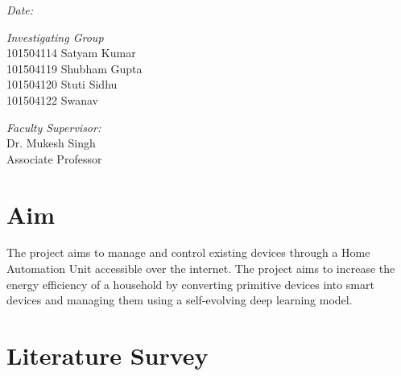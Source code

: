 \documentclass[12pt,a4paper,titlepage,twoside]{article}
\begin{document}
    	\begin{minipage}{0.5\textwidth}
    		\begin{flushleft}
    			\textit{Date:}
    		\end{flushleft}
    		\begin{flushright}
    			
    			\textit{Investigating Group}\\[0.25cm]
    			101504114 Satyam Kumar\\
    			101504119 Shubham Gupta\\
    			101504120 Stuti Sidhu\\
    			101504122 Swanav\\
    		\end{flushright}
    		\begin{flushleft}
    			\textit{Faculty Supervisor:}\\[0.25cm]
    			Dr. Mukesh Singh\\
    			Associate Professor\\
    		\end{flushleft}
    	\end{minipage}
        \section{Aim}
        	The project aims to manage and control existing devices through a Home Automation Unit accessible over the internet.
            The project aims to increase the energy efficiency of a household by converting primitive devices into smart devices and managing them using a self-evolving deep learning model.
        
        \section{Literature Survey}
\end{document}
